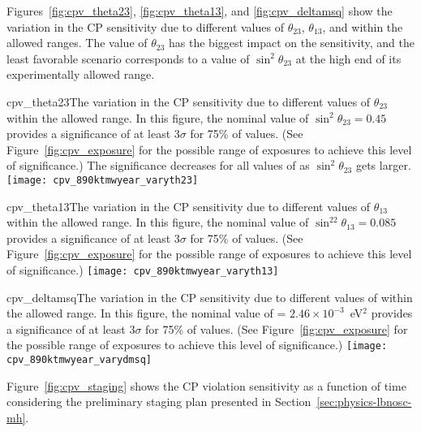 Figures~\ref{fig:cpv_theta23}, \ref{fig:cpv_theta13}, and \ref{fig:cpv_deltamsq} show the variation in the CP sensitivity due to different values of $\theta_{23}$, $\theta_{13}$, and  within the allowed ranges.  The value of $\theta_{23}$ has the biggest impact on the sensitivity, and the least favorable scenario corresponds to a value of $\sin^2{\theta_{23}}$ at the high end of its 
experimentally allowed range.

\begin{cdrfigure}{cpv_theta23}{The variation in the CP sensitivity due to different values of $\theta_{23}$ within the allowed range.  In this figure, the nominal value of $\sin^2\theta_{23} = 0.45$ provides a significance of at least 3$\sigma$ for 75\% of \deltacp values. (See Figure~\ref{fig:cpv_exposure} for the possible range of exposures to achieve this level of significance.) The significance decreases for all values of \deltacp as $\sin^2\theta_{23}$ gets larger.}
 \texttt{[image: cpv\_890ktmwyear\_varyth23]}
\end{cdrfigure}

\begin{cdrfigure}{cpv_theta13}{The variation in the CP sensitivity due to different values of $\theta_{13}$ within the allowed range.  In this figure, the nominal value of $\sin^22\theta_{13} = 0.085$ provides a significance of at least 3$\sigma$ for 75\% of \deltacp values. (See Figure~\ref{fig:cpv_exposure} for the possible range of exposures to achieve this level of significance.)}
 \texttt{[image: cpv\_890ktmwyear\_varyth13]}
\end{cdrfigure}

\begin{cdrfigure}{cpv_deltamsq}{The variation in the CP sensitivity due to different values of  within the allowed range.  In this figure, the nominal value of  = $2.46\times 10^{-3}$~eV$^2$ provides a significance of at least 3$\sigma$ for 75\% of \deltacp values.  (See Figure~\ref{fig:cpv_exposure} for the possible range of exposures to achieve this level of significance.)}
 \texttt{[image: cpv\_890ktmwyear\_varydmsq]}
\end{cdrfigure}

Figure~\ref{fig:cpv_staging} shows the CP violation sensitivity as a function of time considering the preliminary staging plan presented in Section~\ref{sec:physics-lbnosc-mh}.

